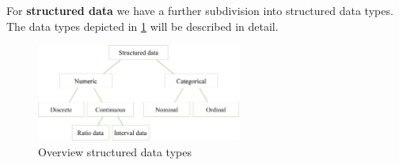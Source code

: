 For \textbf{structured data} we have a further subdivision into structured data types. The data types depicted in \ref{fig:1_structured_data} will be described in detail.

\begin{figure}[H]
  \centering
  \includegraphics[width=0.6\textwidth]{assets/basics/structured_data.png}
  \caption{Overview structured data types}
  \label{fig:1_structured_data}
\end{figure}

